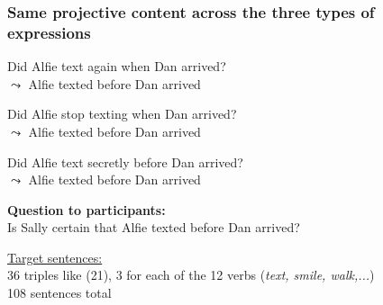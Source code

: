 \documentclass[pdf,xcolor=table,envcountsect,handout]{beamer}
\begin{document}
\begin{frame}
\frametitle{Same projective content across the three types of expressions}

\pause

\begin{exe}

\begin{xlist}

\ex Did Alfie text again when Dan arrived? \\ $\leadsto$ Alfie texted before Dan arrived

\pause


\ex Did Alfie stop texting when Dan arrived? \\ $\leadsto$ Alfie texted before Dan arrived

\pause

\ex Did Alfie text secretly before Dan arrived? \\ $\leadsto$ Alfie texted before Dan arrived

\end{xlist}

\end{exe}

\pause

{\bf Question to participants:} \\[-.1cm] \hspace*{.5cm} Is Sally certain that Alfie texted before Dan arrived? 

\medskip
\pause

\underline{Target sentences:}
\\
36 triples like (21), 3 for each of the 12 verbs ({\em text, smile, walk,...})
\\
108 sentences total

\end{frame}
\end{document}
